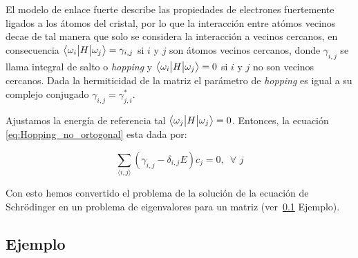     El modelo de enlace fuerte describe las propiedades de electrones fuertemente ligados a los átomos del cristal, por lo que la interacción entre atómos vecinos decae de tal manera que solo se considera la interacción a vecinos cercanos, en consecuencia  $\big \langle{\omega_i}\big | {H} \big | {\omega_j} \big \rangle = \gamma_{i,j}$ si $i$ y $j$ son átomos vecinos cercanos, donde $\gamma_{i,j}$ se llama integral de salto o {\it hopping} y $\big \langle{\omega_i}\big | {H} \big | {\omega_j} \big \rangle = 0$ si $i$ y $j$ no son vecinos cercanos. Dada la hermiticidad de la matriz el parámetro de {\it hopping} es igual a su complejo conjugado $\gamma_{i,j} = \gamma^*_{j,i}$.

    Ajustamos la energía de referencia tal $\big \langle{\omega_j}\big | {H} \big | {\omega_j} \big \rangle = 0$. Entonces, la ecuación \ref{eq:Hopping_no_ortogonal} esta dada por:

    \begin{equation}
        \sum_{\langle i, j \rangle } ( \gamma_{i,j} - \delta_{i,j}E )c_j = 0, \,\,\, \forall\,\, j
    \end{equation}
    
    
    
    
    Con esto hemos convertido el problema de la solución de la ecuación de Schrödinger en un problema de eigenvalores para un matriz (ver~\ref{SecEjemplo} Ejemplo).

    \subsection{Ejemplo}
    \label{SecEjemplo}
    \vspace{-1.5cm}

